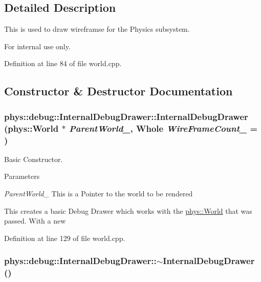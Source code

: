 \subsection{Detailed Description}
This is used to draw wireframse for the Physics subsystem. \begin{DoxyInternal}{For internal use only.}
\end{DoxyInternal}


Definition at line 84 of file world.cpp.



\subsection{Constructor \& Destructor Documentation}
\hypertarget{classphys_1_1debug_1_1InternalDebugDrawer_a0e701e00e1080fdadfcf35e9051789a3}{
\subsubsection[{InternalDebugDrawer}]{\setlength{\rightskip}{0pt plus 5cm}phys::debug::InternalDebugDrawer::InternalDebugDrawer ({\bf phys::World} $\ast$ {\em ParentWorld\_\-}, \/  {\bf Whole} {\em WireFrameCount\_\-} = {})}}
\label{db/d27/classphys_1_1debug_1_1InternalDebugDrawer_a0e701e00e1080fdadfcf35e9051789a3}


Basic Constructor. 


\begin{DoxyParams}{Parameters}
\item[{\em ParentWorld\_\-}]This is a Pointer to the world to be rendered\end{DoxyParams}
This creates a basic Debug Drawer which works with the \hyperlink{classphys_1_1World}{phys::World} that was passed. With a new 

Definition at line 129 of file world.cpp.

\hypertarget{classphys_1_1debug_1_1InternalDebugDrawer_a9b5cb5ec48541effddb305de12508323}{
\subsubsection[{$\sim$InternalDebugDrawer}]{\setlength{\rightskip}{0pt plus 5cm}phys::debug::InternalDebugDrawer::$\sim$InternalDebugDrawer ()}}
\label{db/d27/classphys_1_1debug_1_1InternalDebugDrawer_a9b5cb5ec48541effddb305de12508323}


